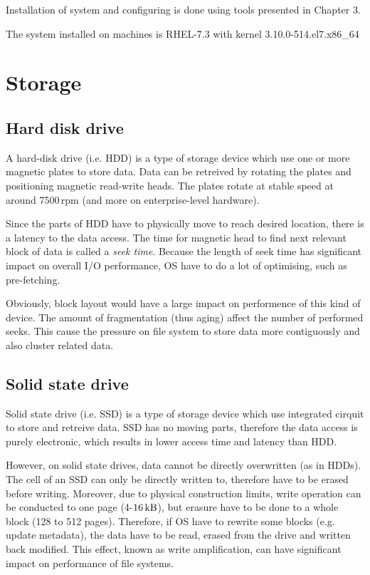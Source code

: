 \documentclass[
  color, %
  table, %
  lof,   %
  lot,   %
]{fithesis3}
\begin{document}
Installation of system and configuring is done using tools presented in Chapter 3. 

The system installed on machines is RHEL-7.3 with kernel 3.10.0-514.el7.x86\_64

\section{Storage}

\subsection{Hard disk drive}
A hard-disk drive (i.e. HDD) is a type of storage device which use one or more magnetic plates to store data. Data can be retreived by rotating the plates and positioning magnetic read-write heads. The plates rotate at stable speed at around 7500\,rpm (and more on enterprise-level hardware).

Since the parts of HDD have to physically move to reach desired location, there is a latency to the data access. The time for magnetic head to find next relevant block of data is called a \textit{seek time}. Because the length of seek time has significant impact on overall I/O performance, OS have to do a lot of optimising, such as pre-fetching.

Obviously, block layout would have a large impact on performence of this kind of device. The amount of fragmentation (thus aging) affect the number of performed seeks. This cause the pressure on file system to store data more contiguously and also cluster related data.

\subsection{Solid state drive}
Solid state drive (i.e. SSD) is  a type of storage device which use integrated cirquit to store and retreive data. SSD has no moving parts, therefore the data access is purely electronic, which results in lower access time and latency than HDD.

However, on solid state drives, data cannot be directly overwritten (as in HDDs). The cell of an SSD can only be directly written to, therefore have to be erased before writing. Moreover, due to physical construction limits, write operation can be conducted to one page (4-$\SI{16}{\kilo\byte}$), but erasure have to be done to a whole block (128 to 512 pages). Therefore, if OS have to rewrite some blocks (e.g. update metadata), the data have to be read, erased from the drive and written back modified. This effect, known as write amplification, can have significant impact on performance of file systems. 
\end{document}
